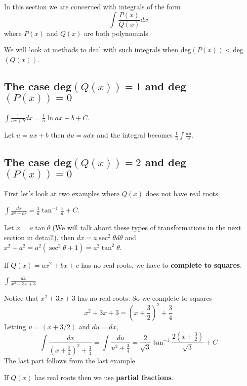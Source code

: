 \documentclass[../calc1-main.tex]{subfiles}
\begin{document}
In this section we are concerned with integrals of the form
\[
	\int \frac{P(x)}{Q(x)} dx
\]
where $P(x)$ and $Q(x)$ are both polynomials.

We will look at methods to deal with such integrals when deg$(P(x)) <$deg$(Q(x))$.

\subsection*{The case deg$(Q(x)) = 1$ and deg$(P(x)) = 0$}
\begin{example}
	$\displaystyle \int \frac{1}{ax + b} dx = \frac{1}{a} \ln{ax+b} + C$.
\end{example}
\begin{solution}
	Let $u= ax+b$ then $du = adx$ and the integral becomes $\frac{1}{a}\int \frac{du}{u}$.
\end{solution}

\subsection*{The case deg$(Q(x)) = 2$ and deg$(P(x)) = 0$}
First let's look at two examples where $Q(x)$ does not have real roots.
\begin{example}
	$\displaystyle \int \frac{dx}{x^2+a^2} = \frac{1}{a} \tan^{-1} \frac{x}{a} + C$.
\end{example}
\begin{solution}
	Let $x=a\tan \theta$ (We will talk about these types of transformations in the next section in detail!), then $dx = a \sec^2 \theta d\theta$ and $x^2+a^2 = a^2(\sec^2\theta + 1) = a^2 \tan^2 \theta$.
\end{solution}

If $Q(x) = a x^2 + bx + c$ has no real roots, we have to \textbf{complete to squares}.
\begin{example}
	$ \displaystyle \int \frac{dx}{x^2 + 3x + 3}$
\end{example}
\begin{solution}
	Notice that $x^2 + 3x + 3$ has no real roots. So we complete to squares
	\[
		x^2 + 3x + 3 = (x + \frac{3}{2})^2 + \frac{3}{4}
	\]
	Letting $u = (x+3/2)$ and $du = dx$,
	\[
		\int \frac{dx}{(x + \frac{3}{2})^2 + \frac{3}{4}} =
		\int \frac{du}{u^2 + \frac{3}{4}} = \frac{2}{\sqrt{3}} \tan^{-1} \frac{2(x+\frac{3}{2})}{\sqrt{3}}  + C
	\]
	The last part follows from the last example.
\end{solution}

If $Q(x)$ has real roots then we use \textbf{partial fractions}.
\end{document}
